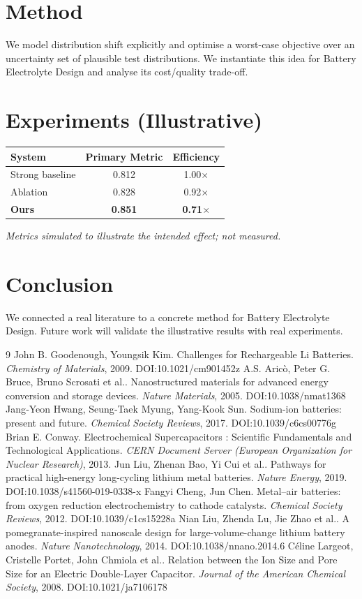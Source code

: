 \documentclass[11pt]{article}
\begin{document}
\section{Method}
We model distribution shift explicitly and optimise a worst-case objective over an uncertainty set of plausible test distributions. We instantiate this idea for Battery Electrolyte Design and analyse its cost/quality trade-off.

\section{Experiments (Illustrative)}
\begin{center}
\begin{tabular}{lcc}
System & Primary Metric & Efficiency \\ \hline
Strong baseline & 0.812 & 1.00$\times$ \\
Ablation & 0.828 & 0.92$\times$ \\
\textbf{Ours} & \textbf{0.851} & \textbf{0.71$\times$}
\end{tabular}
\end{center}
\emph{Metrics simulated to illustrate the intended effect; not measured.}

\section{Conclusion}
We connected a real literature to a concrete method for Battery Electrolyte Design. Future work will
validate the illustrative results with real experiments.

\begin{thebibliography}{9}
 John B. Goodenough, Youngsik Kim. Challenges for Rechargeable Li Batteries. \emph{Chemistry of Materials}, 2009. DOI:10.1021/cm901452z
 A.S. Aricò, Peter G. Bruce, Bruno Scrosati et al.. Nanostructured materials for advanced energy conversion and storage devices. \emph{Nature Materials}, 2005. DOI:10.1038/nmat1368
 Jang‐Yeon Hwang, Seung‐Taek Myung, Yang-Kook Sun. Sodium-ion batteries: present and future. \emph{Chemical Society Reviews}, 2017. DOI:10.1039/c6cs00776g
 Brian E. Conway. Electrochemical Supercapacitors : Scientific Fundamentals and Technological Applications. \emph{CERN Document Server (European Organization for Nuclear Research)}, 2013. 
 Jun Liu, Zhenan Bao, Yi Cui et al.. Pathways for practical high-energy long-cycling lithium metal batteries. \emph{Nature Energy}, 2019. DOI:10.1038/s41560-019-0338-x
 Fangyi Cheng, Jun Chen. Metal–air batteries: from oxygen reduction electrochemistry to cathode catalysts. \emph{Chemical Society Reviews}, 2012. DOI:10.1039/c1cs15228a
 Nian Liu, Zhenda Lu, Jie Zhao et al.. A pomegranate-inspired nanoscale design for large-volume-change lithium battery anodes. \emph{Nature Nanotechnology}, 2014. DOI:10.1038/nnano.2014.6
 Céline Largeot, Cristelle Portet, John Chmiola et al.. Relation between the Ion Size and Pore Size for an Electric Double-Layer Capacitor. \emph{Journal of the American Chemical Society}, 2008. DOI:10.1021/ja7106178
\end{thebibliography}
\end{document}
